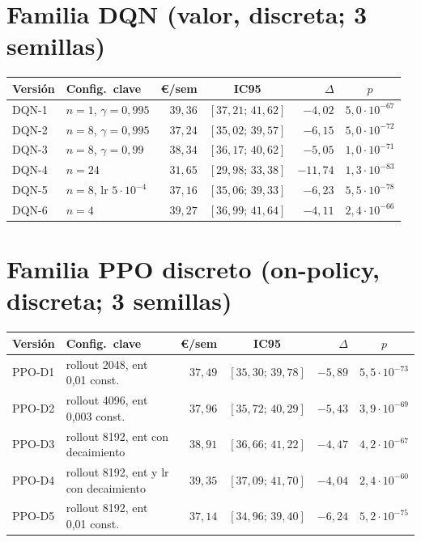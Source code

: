 \documentclass[12pt, a4paper, twoside]{report}
\begin{document}
\section{Familia DQN (valor, discreta; 3 semillas)}

\begin{table}[H]
\centering\small
\begin{tabular}{llrcrc}
\toprule
\textbf{Versión} & \textbf{Config.\ clave} & \textbf{€/sem} & \textbf{IC95} &
\textbf{$\Delta$} & \textbf{$p$} \\
\midrule
DQN-1 & $n{=}1$, $\gamma{=}0{,}995$ & $39{,}36$ & $[37{,}21;\,41{,}62]$ & $-4{,}02$ & $5{,}0\cdot10^{-67}$ \\
DQN-2 & $n{=}8$, $\gamma{=}0{,}995$ & $37{,}24$ & $[35{,}02;\,39{,}57]$ & $-6{,}15$ & $5{,}0\cdot10^{-72}$ \\
DQN-3 & $n{=}8$, $\gamma{=}0{,}99$ & $38{,}34$ & $[36{,}17;\,40{,}62]$ & $-5{,}05$ & $1{,}0\cdot10^{-71}$ \\
DQN-4 & $n{=}24$ & $31{,}65$ & $[29{,}98;\,33{,}38]$ & $-11{,}74$ & $1{,}3\cdot10^{-83}$ \\
DQN-5 & $n{=}8$, lr $5\cdot10^{-4}$ & $37{,}16$ & $[35{,}06;\,39{,}33]$ & $-6{,}23$ & $5{,}5\cdot10^{-78}$ \\
DQN-6 & $n{=}4$ & $39{,}27$ & $[36{,}99;\,41{,}64]$ & $-4{,}11$ & $2{,}4\cdot10^{-66}$ \\
\bottomrule
\end{tabular}
\end{table}

\section{Familia PPO discreto (on-policy, discreta; 3 semillas)}

\begin{table}[H]
\centering\small
\begin{tabular}{llrcrc}
\toprule
\textbf{Versión} & \textbf{Config.\ clave} & \textbf{€/sem} & \textbf{IC95} &
\textbf{$\Delta$} & \textbf{$p$} \\
\midrule
PPO-D1 & rollout 2048, ent 0{,}01 const. & $37{,}49$ & $[35{,}30;\,39{,}78]$ & $-5{,}89$ & $5{,}5\cdot10^{-73}$ \\
PPO-D2 & rollout 4096, ent 0{,}003 const. & $37{,}96$ & $[35{,}72;\,40{,}29]$ & $-5{,}43$ & $3{,}9\cdot10^{-69}$ \\
PPO-D3 & rollout 8192, ent con decaimiento & $38{,}91$ & $[36{,}66;\,41{,}22]$ & $-4{,}47$ & $4{,}2\cdot10^{-67}$ \\
PPO-D4 & rollout 8192, ent y lr con decaimiento & $39{,}35$ & $[37{,}09;\,41{,}70]$ & $-4{,}04$ & $2{,}4\cdot10^{-60}$ \\
PPO-D5 & rollout 8192, ent 0{,}01 const. & $37{,}14$ & $[34{,}96;\,39{,}40]$ & $-6{,}24$ & $5{,}2\cdot10^{-75}$ \\
\bottomrule
\end{tabular}
\end{table}
\end{document}
